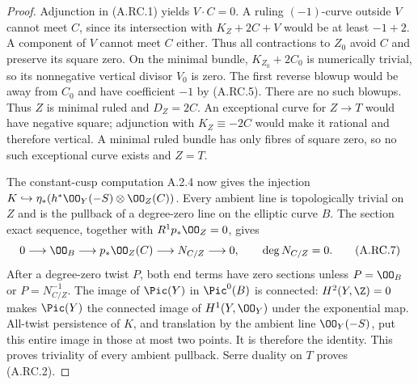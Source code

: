 \begin{proof}
Adjunction in (A.RC.1) yields $V\cdot C=0$. A ruling
$(-1)$-curve outside $V$ cannot meet $C$, since its
intersection with $K_Z+2C+V$ would be at least $-1+2$.
A component of $V$ cannot meet $C$ either. Thus all
contractions to $Z_0$ avoid $C$ and preserve its square zero.
On the minimal bundle, $K_{Z_0}+2C_0$ is numerically trivial,
so its nonnegative vertical divisor $V_0$ is zero.
The first reverse blowup would be away from $C_0$ and have
coefficient $-1$ by (A.RC.5). There are no such blowups.
Thus $Z$ is minimal ruled and $D_Z=2C$.
An exceptional curve for $Z\to T$ would have negative square;
adjunction with $K_Z\equiv-2C$ would make it rational and
therefore vertical. A minimal ruled bundle has only fibres
of square zero, so no such exceptional curve exists and $Z=T$.

The constant-cusp computation A.2.4 now gives the injection
$K\hookrightarrow\eta_*(h^*\OO_Y(-S)\otimes\OO_Z(C))$.
Every ambient line is topologically trivial on $Z$ and is
the pullback of a degree-zero line on the elliptic curve $B$.
The section exact sequence, together with $R^1p_*\OO_Z=0$,
gives
\[
 0\longrightarrow\OO_B\longrightarrow p_*\OO_Z(C)
 \longrightarrow N_{C/Z}\longrightarrow0,
 \qquad\deg N_{C/Z}=0.                              \tag{A.RC.7}
\]
After a degree-zero twist $P$, both end terms have zero
sections unless $P=\OO_B$ or $P=N_{C/Z}^{-1}$.
The image of $\Pic(Y)$ in $\Pic^0(B)$ is connected:
$H^2(Y,\Z)=0$ makes $\Pic(Y)$ the connected image of
$H^1(Y,\OO_Y)$ under the exponential map.
All-twist persistence of $K$, and translation by the ambient
line $\OO_Y(-S)$, put this entire image in those at most two
points. It is therefore the identity. This proves triviality
of every ambient pullback. Serre duality on $T$ proves
(A.RC.2).
\end{proof}

